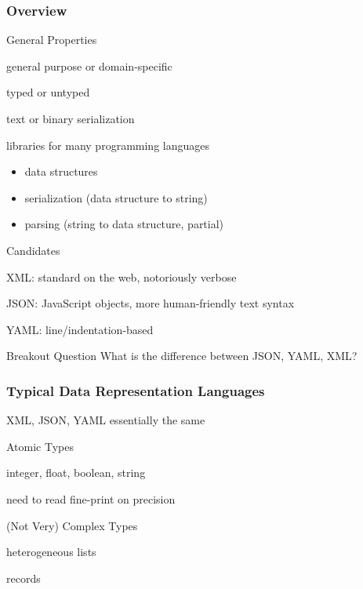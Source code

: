 \begin{frame}\frametitle{Overview}
\begin{blockitems}{General Properties}
 \item general purpose or domain-specific
 \item typed or untyped
 \item text or binary serialization
 \item libraries for many programming languages
  \begin{itemize}
  \item data structures
  \item serialization (data structure to string)
  \item parsing (string to data structure, partial)
  \end{itemize}
\end{blockitems}

\begin{blockitems}{Candidates}
 \item XML: standard on the web, notoriously verbose
 \item JSON: JavaScript objects, more human-friendly text syntax
 \item YAML: line/indentation-based
\end{blockitems}
\end{frame}

\begin{frame}{Breakout Question}
What is the difference between JSON, YAML, XML?
\end{frame}

\begin{frame}\frametitle{Typical Data Representation Languages}
XML, JSON, YAML essentially the same

\begin{blockitems}{Atomic Types}
 \item integer, float, boolean, string
 \item need to read fine-print on precision
\end{blockitems}
 
\begin{blockitems}{(Not Very) Complex Types}
 \item heterogeneous lists
 \item records
\end{blockitems}
\end{frame}

